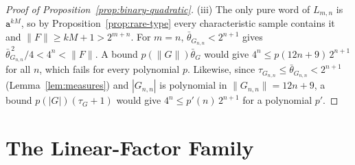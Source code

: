 \documentclass[11pt]{article}
\numberwithin{equation}{section}
\theoremstyle{plain}
\theoremstyle{definition}
\theoremstyle{remark}
\theoremstyle{plain}
\begin{document}
\begin{proof}[Proof of Proposition~\ref{prop:binary-quadratic}]
(iii) The only pure word of $L_{m,n}$ is $\mathtt a^{kM}$, so by
Proposition~\ref{prop:rare-type} every characteristic sample contains it and
$\|F\|\ge kM+1>2^{m+n}$.  For $m=n$, $\bar\theta_{G_{n,n}}<2^{n+1}$ gives
$\bar\theta_{G_{n,n}}^{\,2}/4<4^n<\|F\|$.  A bound $p(\|G\|)\bar\theta_G$ would give
$4^n\le p(12n+9)\,2^{n+1}$ for all $n$, which fails for every polynomial $p$.  Likewise, since $\tau_{G_{n,n}}\le\bar\theta_{G_{n,n}}<2^{n+1}$
(Lemma~\ref{lem:measures}) and $|G_{n,n}|$ is polynomial in $\|G_{n,n}\|=12n+9$, a
bound $p(|G|)(\tau_G+1)$ would give $4^n\le p'(n)\,2^{n+1}$ for a polynomial $p'$.
\end{proof}

\section{The Linear-Factor Family}
\label{app:linear}
\end{document}
